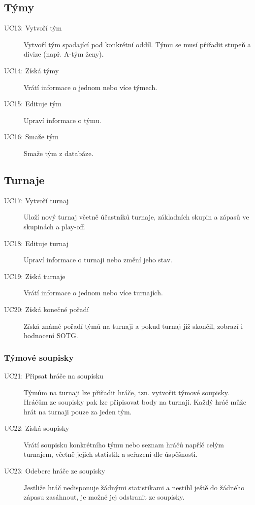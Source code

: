 \subsection*{Týmy}
  \begin{description}
    \item[UC13: Vytvoří tým]
      Vytvoří tým spadající pod konkrétní oddíl. Týmu se musí přiřadit stupeň a divize (např. A-tým ženy).
    \item[UC14: Získá týmy]
      Vrátí informace o jednom nebo více týmech.
    \item[UC15: Edituje tým]
      Upraví informace o týmu.
    \item[UC16: Smaže tým]
      Smaže tým z databáze.
  \end{description}

\subsection*{Turnaje}
  \begin{description}
    \item[UC17: Vytvoří turnaj]
      Uloží nový turnaj včetně účastníků turnaje, základních skupin a zápasů ve skupinách a play-off.
    \item[UC18: Edituje turnaj]
      Upraví informace o turnaji nebo změní jeho stav.
    \item[UC19: Získá turnaje]
      Vrátí informace o jednom nebo více turnajích.
    \item[UC20: Získá konečné pořadí]
      Získá známé pořadí týmů na turnaji a pokud turnaj již skončil, zobrazí i hodnocení SOTG.
  \end{description}

\subsubsection*{Týmové soupisky}
  \begin{description}
    \item[UC21: Připsat hráče na soupisku]
      Týmům na turnaji lze přiřadit hráče, tzn. vytvořit týmové soupisky. Hráčům ze soupisky
      pak lze připisovat body na turnaji. Každý hráč může hrát na turnaji pouze za jeden tým.
    \item[UC22: Získá soupisky]
      Vrátí soupisku konkrétního týmu nebo seznam hráčů napříč celým turnajem, včetně jejich statistik a seřazení dle úspěšnosti.
    \item[UC23: Odebere hráče ze soupisky]
      Jestliže hráč nedisponuje žádnými statistikami a nestihl ještě do žádného zápasu zasáhnout, je možné jej odstranit ze soupisky.
  \end{description}

